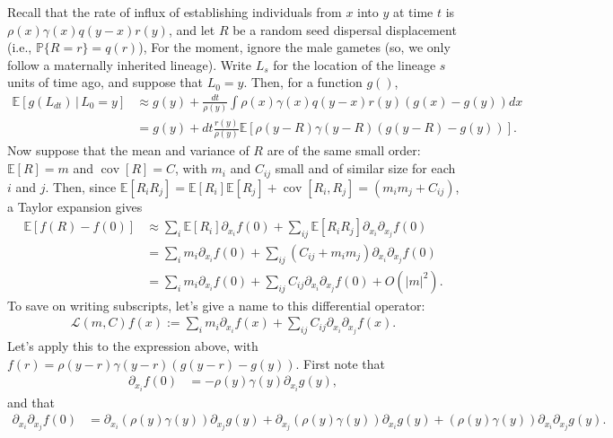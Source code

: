 \documentclass{article}
\renewcommand{\P}{\mathbb{P}}
\newcommand{\E}{\mathbb{E}}
\DeclareMathOperator{\cov}{cov}
\newcommand{\given}{\,\vert\,}
\newcommand{\diffop}{\mathcal{L}}
\begin{document}
Recall that the rate of influx of establishing individuals from $x$ into $y$ at time $t$ is
$\rho(x) \gamma(x) q(y - x) r(y)$,
and let $R$ be a random seed dispersal displacement (i.e., $\P\{R = r\} = q(r)$),
For the moment, ignore the male gametes (so, we only follow a maternally inherited lineage).
Write $L_s$ for the location of the lineage $s$ units of time ago,
and suppose that $L_0 = y$.
Then, for a function $g( )$,
\begin{align*}
    \E[g(L_{dt}) \given L_0 = y]
    &\approx
        g(y) 
        + \frac{dt}{\rho(y)} \int \rho(x) \gamma(x) q(y - x) r(y) \left(g(x) - g(y)\right) dx \\
    &=
        g(y) 
        + dt \frac{r(y)}{\rho(y)} \E\left[ \rho(y - R) \gamma(y - R) \left(g(y - R) - g(y)\right) \right] .
\end{align*}
Now suppose that the mean and variance of $R$ are of the same small order:
$\E[R] = m$ and $\cov[R] = C$,
with $m_i$ and $C_{ij}$ small and of similar size for each $i$ and $j$.
Then, since $\E[R_i R_j] = \E[R_i] \E[R_j] + \cov[R_i, R_j] = (m_i m_j + C_{ij})$,
a Taylor expansion gives
\begin{align*}
    \E[f(R) - f(0)]
    &\approx
        \sum_i \E[R_i] \partial_{x_i} f(0) 
            + \sum_{ij} \E[R_i R_j] \partial_{x_i} \partial_{x_j} f(0) \\
    &=
        \sum_i m_i \partial_{x_i} f(0) 
            + \sum_{ij} \left(C_{ij} + m_i m_j\right) \partial_{x_i} \partial_{x_j} f(0) \\
    &=
        \sum_i m_i \partial_{x_i} f(0) 
            + \sum_{ij} C_{ij} \partial_{x_i} \partial_{x_j} f(0) + O(|m|^2) .
\end{align*}
To save on writing subscripts, let's give a name to this differential operator:
\begin{align*}
    \diffop(m, C) f(x) 
    :=
        \sum_i m_i \partial_{x_i} f(x) 
            + \sum_{ij} C_{ij} \partial_{x_i} \partial_{x_j} f(x) .
\end{align*}
Let's apply this to the expression above,
with $f(r) = \rho(y - r) \gamma(y - r) (g(y - r) - g(y))$.
First note that
\begin{align*}
    \partial_{x_i} f(0)
    &= - \rho(y) \gamma(y) \partial_{x_i} g(y),
\end{align*}
and that
\begin{align*}
    \partial_{x_i} \partial_{x_j} f(0)
    &= \partial_{x_i} \left(\rho(y) \gamma(y)\right) \partial_{x_j} g(y)
       + \partial_{x_j} \left(\rho(y) \gamma(y)\right) \partial_{x_i} g(y)
       + \left(\rho(y) \gamma(y)\right) \partial_{x_i} \partial_{x_j} g(y) .
\end{align*}
\end{document}
